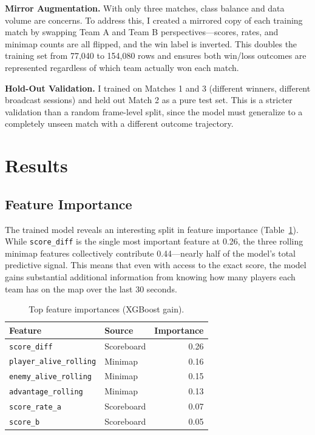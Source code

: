 \documentclass[10pt, twocolumn]{article}
\begin{document}
\textbf{Mirror Augmentation.} With only three matches, class balance and data volume are concerns. To address this, I created a mirrored copy of each training match by swapping Team A and Team B perspectives---scores, rates, and minimap counts are all flipped, and the win label is inverted. This doubles the training set from 77,040 to 154,080 rows and ensures both win/loss outcomes are represented regardless of which team actually won each match.

\textbf{Hold-Out Validation.} I trained on Matches 1 and 3 (different winners, different broadcast sessions) and held out Match 2 as a pure test set. This is a stricter validation than a random frame-level split, since the model must generalize to a completely unseen match with a different outcome trajectory.

\section{Results}

\subsection{Feature Importance}

The trained model reveals an interesting split in feature importance (Table~\ref{tab:importance}). While \texttt{score\_diff} is the single most important feature at 0.26, the three rolling minimap features collectively contribute 0.44---nearly half of the model's total predictive signal. This means that even with access to the exact score, the model gains substantial additional information from knowing how many players each team has on the map over the last 30 seconds.

\begin{table}[h]
\centering
\caption{Top feature importances (XGBoost gain).}
\label{tab:importance}
\small
\begin{tabular}{@{}llr@{}}
\toprule
\textbf{Feature} & \textbf{Source} & \textbf{Importance} \\
\midrule
\texttt{score\_diff} & Scoreboard & 0.26 \\
\texttt{player\_alive\_rolling} & Minimap & 0.16 \\
\texttt{enemy\_alive\_rolling} & Minimap & 0.15 \\
\texttt{advantage\_rolling} & Minimap & 0.13 \\
\texttt{score\_rate\_a} & Scoreboard & 0.07 \\
\texttt{score\_b} & Scoreboard & 0.05 \\
\bottomrule
\end{tabular}
\end{table}
\end{document}
